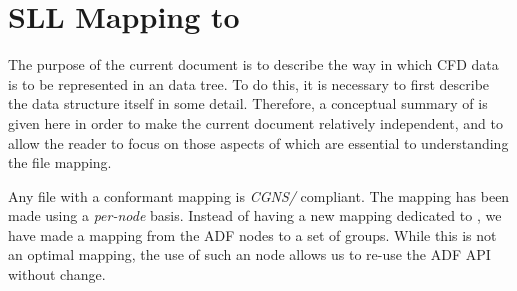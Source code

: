 %
%
%
%
%
%
%

\section{SLL Mapping to \HDF}
\label{s:hdfsummary}
\thispagestyle{plain}


The purpose of the current document is to describe the way in which
CFD data is to be represented in an \HDF data tree. To do this, it is necessary
to first describe the \HDF data structure itself in some
detail. Therefore, a conceptual summary of \HDF is given here in order
to make the current document relatively independent, and to allow
the reader to focus on those aspects of \HDF which are essential to
understanding the file mapping.

Any \HDF file with a conformant mapping is \emph{CGNS/\HDF} compliant. The
mapping has been made using a \emph{per-node} basis. Instead of having a new
mapping dedicated to \HDF, we have made a mapping from the ADF nodes
to a set of \HDF groups. While this is not an optimal mapping, the use of 
such an \HDF node allows us to re-use the ADF API without change.

